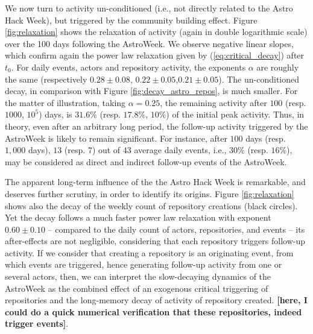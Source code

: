 We now turn to activity un-conditioned (i.e., not directly related to the Astro Hack Week), but triggered by the community building effect. Figure \ref{fig:relaxation} shows the relaxation of activity (again in double logarithmic scale) over the 100 days following the AstroWeek. We observe negative linear slopes, which confirm again the power law relaxation given by (\ref{eq:critical_decay}) after $t_0$. For daily events, actors and repository activity, the exponents $\alpha$ are roughly the same (respectively $0.28\pm0.08$, $0.22\pm0.05$,$0.21\pm0.05$). The un-conditioned decay, in comparison with Figure \ref{fig:decay_astro_repos}, is much smaller. For the matter of illustration, taking $\alpha = 0.25$, the remaining activity after $100$ (resp. $1000$, $10^5$) days, is $31.6\%$ (resp. $17.8\%$, $10\%$) of the initial peak activity. Thus, in theory, even after an arbitrary long period, the follow-up activity triggered by the AstroWeek is likely to remain significant. For instance, after $100$ days (resp. $1,000$ days), $13$ (resp. $7$) out of $43$ average daily events, i.e., $30\%$ (resp. $16\%$), may be considered as direct and indirect follow-up events of the AstroWeek. 

The apparent long-term influence of the the Astro Hack Week is remarkable, and deserves further scrutiny, in order to identify its origins. Figure \ref{fig:relaxation} shows also the decay of the weekly count of repository creations (black circles). Yet the decay follows a much faster power law relaxation with exponent $0.60\pm0.10$ -- compared to the daily count of actors, repositories, and events -- its after-effects are not negligible, considering that each repository triggers follow-up activity. If we consider that creating a repository is an originating event, from which events are triggered, hence generating follow-up activity from one or several actors, then, we can interpret the slow-decaying dynamics of the AstroWeek as the combined effect of an exogenous critical triggering of repositories and the long-memory decay of activity of repository created. {\bf [here, I could do a quick numerical verification that these repositories, indeed trigger events]}. 


